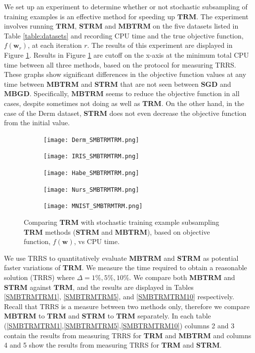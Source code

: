 \documentclass[letterpaper,12pt,titlepage,oneside,final]{book}
\begin{document}
	We set up an experiment to determine whether or not stochastic subsampling of training examples is an effective method for speeding up $\mathbf{TRM}$. The experiment involves running $\mathbf{TRM}$, $\mathbf{STRM}$ and $\mathbf{MBTRM}$ on the five datasets listed in Table \ref{table:datasets} and recording CPU time and the true objective function, $f(\mathbf{w}_{r})$, at each iteration $r$. The results of this experiment are displayed in Figure \ref{figure:SMBTRMTRM}. Results in Figure \ref{figure:SMBTRMTRM} are cutoff on the x-axis at the minimum total CPU time between all three methods, based on the protocol for measuring TRRS. These graphs show significant differences in the objective function values at any time between \textbf{MBTRM} and \textbf{STRM} that are not seen between $\mathbf{SGD}$ and $\mathbf{MBGD}$. Specifically, $\mathbf{MBTRM}$ seems to reduce the objective function in all cases, despite sometimes not doing as well as \textbf{TRM}. On the other hand, in the case of the Derm dataset, \textbf{STRM} does not even decrease the objective function from the initial value. 
	
	\begin{figure}
		\centering
		\begin{subfigure}{.45\textwidth}
			\texttt{[image: Derm\_SMBTRMTRM.png]}
		\end{subfigure}%
		\begin{subfigure}{.45\textwidth}
			\texttt{[image: IRIS\_SMBTRMTRM.png]}
		\end{subfigure}
		\begin{subfigure}{.45\textwidth}
			\texttt{[image: Habe\_SMBTRMTRM.png]}
		\end{subfigure}
		\begin{subfigure}{.45\textwidth}
			\texttt{[image: Nurs\_SMBTRMTRM.png]}
		\end{subfigure}
		\begin{subfigure}{.45\textwidth}
			\texttt{[image: MNIST\_SMBTRMTRM.png]}
		\end{subfigure}
		\caption{Comparing \textbf{TRM} with stochastic training example subsampling \textbf{TRM} methods (\textbf{STRM} and \textbf{MBTRM}), based on objective function, $f(\mathbf{w})$, vs CPU time.}
		\label{figure:SMBTRMTRM}
	\end{figure}
	
	
	We use TRRS to quantitatively evaluate \textbf{MBTRM} and \textbf{STRM} as potential faster variations of \textbf{TRM}. We measure the time required to obtain a reasonable solution (TRRS) where $\Delta = 1\%, 5\%, 10\%$. We compare both \textbf{MBTRM} and \textbf{STRM} against $\mathbf{TRM}$, and the results are displayed in Tables \ref{SMBTRMTRM1}, \ref{SMBTRMTRM5}, and \ref{SMBTRMTRM10} respectively. Recall that TRRS is a measure between two methods only, therefore we compare \textbf{MBTRM} to \textbf{TRM} and \textbf{STRM} to \textbf{TRM} separately. In each table (\ref{SMBTRMTRM1},\ref{SMBTRMTRM5},\ref{SMBTRMTRM10}) columns 2 and 3 contain the results from measuring TRRS for \textbf{TRM} and \textbf{MBTRM} and columns 4 and 5 show the results from measuring TRRS for \textbf{TRM} and \textbf{STRM}.
	
\end{document}

